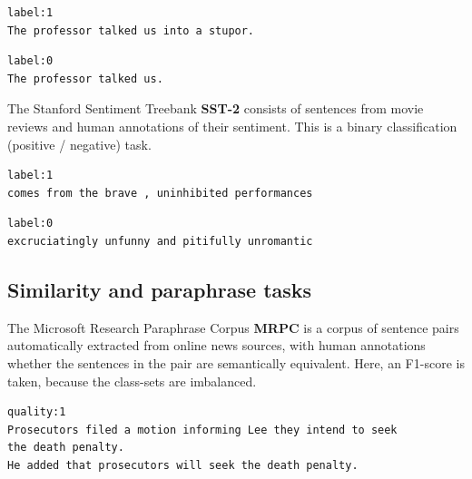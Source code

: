 \documentclass[a4paper,12pt,oneside,openright]{report}
\begin{document}
\begin{tcolorbox}
\begin{verbatim}
label:1
The professor talked us into a stupor.
\end{verbatim}
\end{tcolorbox}

\quad

\begin{tcolorbox}
\begin{verbatim}
label:0	
The professor talked us.
\end{verbatim}
\end{tcolorbox}

\quad

The Stanford Sentiment Treebank \textbf{SST-2} \cite{socher2013} consists of sentences from movie reviews and human annotations of their sentiment.
This is a binary classification (positive / negative) task. \\

\begin{tcolorbox}
\begin{verbatim}
label:1
comes from the brave , uninhibited performances
\end{verbatim}
\end{tcolorbox}

\quad

\begin{tcolorbox}
\begin{verbatim}
label:0
excruciatingly unfunny and pitifully unromantic
\end{verbatim}
\end{tcolorbox}

\subsection{Similarity and paraphrase tasks}

The Microsoft Research Paraphrase Corpus \textbf{MRPC} \cite{dolan2005} is a corpus of sentence pairs automatically extracted from online news sources, with human annotations whether the sentences in the pair are semantically equivalent.
Here, an F1-score is taken, because the class-sets are imbalanced.

\begin{tcolorbox}
\begin{verbatim}
quality:1	
Prosecutors filed a motion informing Lee they intend to seek 
the death penalty.	
He added that prosecutors will seek the death penalty.
\end{verbatim}
\end{tcolorbox}
\end{document}
